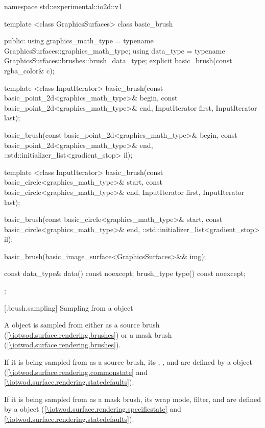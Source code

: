 \begin{codeblock}
namespace std::experimental::io2d::v1 {
template <class GraphicsSurfaces>
class basic_brush {
  public:
    using graphics_math_type = typename GraphicsSurfaces::graphics_math_type;
    using data_type = typename GraphicsSurfaces::brushes::brush_data_type;
    explicit basic_brush(const rgba_color& c);

    template <class InputIterator>
    basic_brush(const basic_point_2d<graphics_math_type>& begin,
      const basic_point_2d<graphics_math_type>& end,
      InputIterator first, InputIterator last);

    basic_brush(const basic_point_2d<graphics_math_type>& begin,
      const basic_point_2d<graphics_math_type>& end,
      ::std::initializer_list<gradient_stop> il);

    template <class InputIterator>
    basic_brush(const basic_circle<graphics_math_type>& start,
      const basic_circle<graphics_math_type>& end,
      InputIterator first, InputIterator last);

    basic_brush(const basic_circle<graphics_math_type>& start,
      const basic_circle<graphics_math_type>& end,
      ::std::initializer_list<gradient_stop> il);

    basic_brush(basic_image_surface<GraphicsSurfaces>&& img);
    
    const data_type& data() const noexcept;
    brush_type type() const noexcept;
  };
}
\end{codeblock}

 [\iotwod.brush.sampling] {Sampling from a  object}

\pnum
A  object is sampled from either as a source brush (\ref{\iotwod.surface.rendering.brushes}) or a mask brush (\ref{\iotwod.surface.rendering.brushes}).

\pnum
If it is being sampled from as a source brush, its , , and  are defined by a  object (\ref{\iotwod.surface.rendering.commonstate} and \ref{\iotwod.surface.rendering.statedefaults}).

\pnum
If it is being sampled from as a mask brush, its wrap mode, filter, and  are defined by a  object (\ref{\iotwod.surface.rendering.specificstate} and \ref{\iotwod.surface.rendering.statedefaults}).

